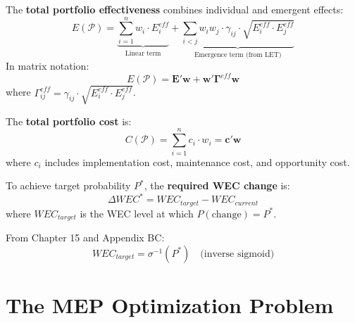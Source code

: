 \begin{definition}
\label{def:portfolio-effect}
The \textbf{total portfolio effectiveness} combines individual and emergent effects:
\begin{equation}
E(\mathcal{P}) = \underbrace{\sum_{i=1}^{n} w_i \cdot E_i^{eff}}_{\text{Linear term}} +
\underbrace{\sum_{i<j} w_i w_j \cdot \gamma_{ij} \cdot \sqrt{E_i^{eff} \cdot E_j^{eff}}}_{\text{Emergence term (from LET)}}
\label{eq:portfolio-effectiveness}
\end{equation}
In matrix notation:
\begin{equation}
E(\mathcal{P}) = \mathbf{E}'\mathbf{w} + \mathbf{w}'\boldsymbol{\Gamma}^{eff}\mathbf{w}
\end{equation}
where $\Gamma^{eff}_{ij} = \gamma_{ij} \cdot \sqrt{E_i^{eff} \cdot E_j^{eff}}$.
\end{definition}

\begin{definition}
\label{def:portfolio-cost}
The \textbf{total portfolio cost} is:
\begin{equation}
C(\mathcal{P}) = \sum_{i=1}^{n} c_i \cdot w_i = \mathbf{c}'\mathbf{w}
\end{equation}
where $c_i$ includes implementation cost, maintenance cost, and opportunity cost.
\end{definition}

\begin{definition}
\label{def:delta-wec}
To achieve target probability $P^*$, the \textbf{required WEC change} is:
\begin{equation}
\Delta WEC^* = WEC_{target} - WEC_{current}
\end{equation}
where $WEC_{target}$ is the WEC level at which $P(\text{change}) = P^*$.

From Chapter 15 and Appendix BC:
\begin{equation}
WEC_{target} = \sigma^{-1}(P^*) \quad \text{(inverse sigmoid)}
\end{equation}
\end{definition}


\section{The MEP Optimization Problem}
\label{sec:mep-problem}

